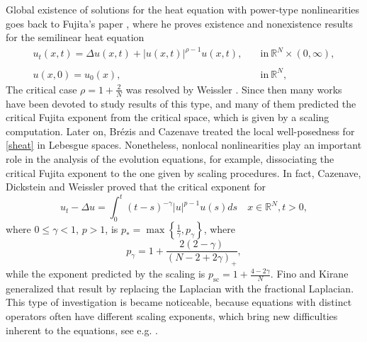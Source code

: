 \documentclass[a4,psfig,english,12pt,epsf,portrait]{article}
\numberwithin{equation}{section}
\def\R{{\mathbb {R}}}
\def\R{\mathbb{R}}
\begin{document}
Global existence of solutions for the heat equation with power-type nonlinearities goes back to Fujita's paper \cite{Fujita}, where he proves existence and nonexistence results for the semilinear heat equation
\begin{equation}\label{sheat}
	\begin{array}{ll}
		u_t(x,t) = \Delta u(x,t) + |u(x,t)|^{\rho-1}u(x,t),&\quad  \mbox{in}\ \R^N \times (0,\infty),\\
		{}\\
		u(x,0)=u_0(x),&\quad  \mbox{in}\ \R^N ,
	\end{array}
\end{equation} 
The critical case $\rho = 1+\frac{2}{N}$ was resolved by Weissler \cite{Weissler}. Since then many works have been devoted to study results of this type, and many of them predicted the critical Fujita exponent from the critical space, which is given by a scaling computation. Later on, Brézis and Cazenave treated the local well-posedness for \eqref{sheat} in Lebesgue spaces. Nonetheless, nonlocal nonlinearities play an important role in the analysis of the evolution equations, for example, dissociating the critical Fujita exponent to the one given by scaling procedures. In fact, Cazenave, Dickstein and Weissler \cite{CDW} proved that the critical exponent for 
$$ u_t-\Delta u=\int_0^t(t-s)^{-\gamma}|u|^{p-1} u(s) d s \quad x \in \mathbb{R}^N, t>0 ,$$
where $0 \leq \gamma<1$, $p>1$, is $p_*=\max \left\{\frac{1}{\gamma}, p_\gamma\right\}$, where
$$
p_\gamma=1+\frac{2(2-\gamma)}{(N-2+2 \gamma)_{+}} ,
$$
while the exponent predicted by the scaling is $p_{\mathrm{sc}}=1+\frac{4-2 \gamma}{N}$. Fino and Kirane \cite{Fino-Ki-12} generalized that result by replacing the Laplacian with the fractional Laplacian. This type of investigation is became noticeable, because equations with distinct operators often have different scaling exponents, which bring new difficulties inherent to the equations, see e.g. \cite{Cas-Loy-19,Dao-Fino-22,Ki-La-T-05,Loy-P-14}. 
\end{document}
